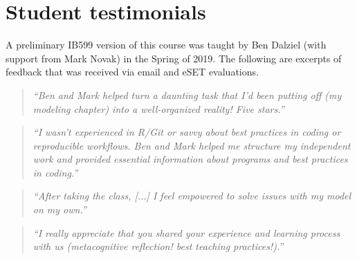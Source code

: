 \documentclass[10pt]{article}
\begin{document}
\section*{Student testimonials}
A preliminary IB599 version of this course was taught by Ben Dalziel (with support from Mark Novak) in the Spring of 2019.  The following are excerpts of feedback that was received via email and eSET evaluations.

\begin{quote}
\emph{``Ben and Mark helped turn a daunting task that I'd been putting off (my modeling chapter) into a well-organized reality! Five stars.''}
\end{quote}
\begin{quote}
	\emph{``I wasn't experienced in R/Git or savvy about best practices in coding or reproducible workflows. Ben and Mark helped me structure my independent work and provided essential information about programs and best practices in coding.''}
\end{quote}
\begin{quote}
	\emph{``After taking the class, [...] I feel empowered to solve issues with my model on my own.''}
\end{quote}
\begin{quote}
	\emph{``I really appreciate that you shared your experience and learning process with us (metacognitive reflection! best teaching practices!).''}
\end{quote}
\end{document}
